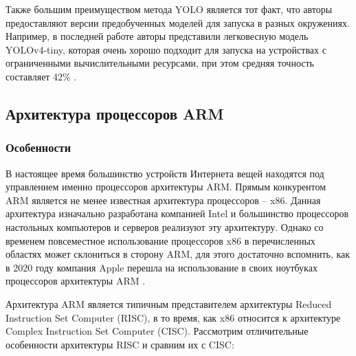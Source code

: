 Также большим преимуществом метода YOLO является тот факт, что авторы предоставляют версии предобученных моделей 
для запуска в разных окружениях. Например, в последней работе авторы представили легковесную модель YOLOv4-tiny, 
которая очень хорошо подходит для запуска на устройствах с ограниченными вычислительными ресурсами, при этом средняя 
точность составляет 42\% \cite{YOLO4_SCALED}.

\subsection{Архитектура процессоров ARM}

\subsubsection{Особенности}
В настоящее время большинство устройств Интернета вещей находятся под управлением именно процессоров архитектуры ARM. 
Прямым конкурентом ARM является не менее известная архитектура процессоров -- x86. Данная архитектура изначально разработана
компанией Intel и большинство процессоров настольных компьютеров и серверов реализуют эту архитектуру. Однако со временем 
повсеместное использование процессоров x86 в перечисленных областях может склониться в сторону ARM, для этого достаточно 
вспомнить, как в 2020 году компания Apple перешла на использование в своих ноутбуках процессоров архитектуры ARM \cite{APPLE_M1}.

Архитектура ARM является типичным представителем архитектуры Reduced Instruction Set Computer (RISC), в то время, как 
x86 относится к архитектуре Complex Instruction Set Computer (CISC). Рассмотрим отличительные особенности архитектуры 
RISC и сравним их с CISC:

